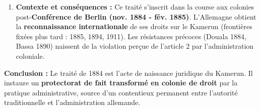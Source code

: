 \documentclass[11pt]{article}
\begin{document}
\begin{exoresolu}
\begin{enumerate}
\begin{itemize}
        \item \textbf{Côté allemand :} Nachtigal et le chancelier Bismarck y voient une \emph{cession de souveraineté} (Hoheitsrechte). L'expression « Schutzgebiet » (territoire de protection) masque une annexion déguisée. L'article 4 instaure l'extraterritorialité judiciaire, signe de soumission.
    \end{itemize}
    \item \textbf{Contexte et conséquences :} Ce traité s'inscrit dans la course aux colonies post-\textbf{Conférence de Berlin (nov. 1884 - fév. 1885)}. L'Allemagne obtient la \textbf{reconnaissance internationale} de ses droits sur le Kamerun (frontières fixées plus tard : 1885, 1894, 1911). Les résistances précoces (Douala 1884, Bassa 1890) naissent de la violation perçue de l'article 2 par l'administration coloniale.
\end{enumerate}
\textbf{Conclusion :} Le traité de 1884 est l'acte de naissance juridique du Kamerun. Il instaure un \textbf{protectorat de fait transformé en colonie de droit} par la pratique administrative, source d'un contentieux permanent entre l'autorité traditionnelle et l'administration allemande.
\end{exoresolu}
\end{document}

